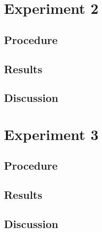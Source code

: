 \documentclass[11pt,jou]{apa6}
\begin{document}
\section{Experiment 2}

\subsection{Procedure}

\subsection{Results}

\subsection{Discussion}



\section{Experiment 3}

\subsection{Procedure}

\subsection{Results}

\subsection{Discussion}




\end{document}
